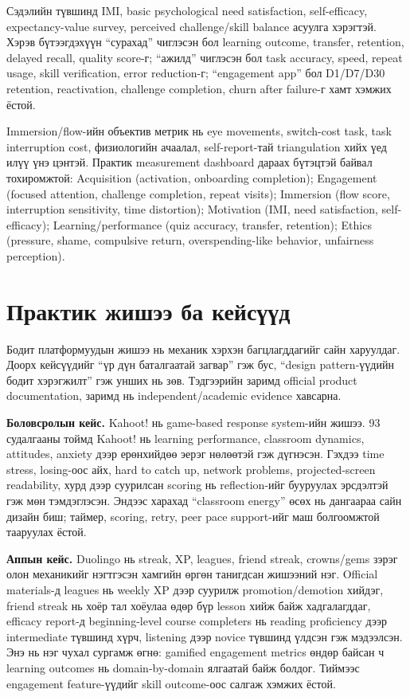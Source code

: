 \begin{sloppy}
Сэдэлийн түвшинд IMI, basic psychological need satisfaction, self-efficacy, expectancy-value survey, perceived challenge/skill balance асуулга хэрэгтэй. Хэрэв бүтээгдэхүүн ``сурахад'' чиглэсэн бол learning outcome, transfer, retention, delayed recall, quality score-г; ``ажилд'' чиглэсэн бол task accuracy, speed, repeat usage, skill verification, error reduction-г; ``engagement app'' бол D1/D7/D30 retention, reactivation, challenge completion, churn after failure-г хамт хэмжих ёстой.

Immersion/flow-ийн объектив метрик нь eye movements, switch-cost task, task interruption cost, физиологийн ачаалал, self-report-тай triangulation хийх үед илүү үнэ цэнтэй. Практик measurement dashboard дараах бүтэцтэй байвал тохиромжтой: Acquisition (activation, onboarding completion); Engagement (focused attention, challenge completion, repeat visits); Immersion (flow score, interruption sensitivity, time distortion); Motivation (IMI, need satisfaction, self-efficacy); Learning/performance (quiz accuracy, transfer, retention); Ethics (pressure, shame, compulsive return, overspending-like behavior, unfairness perception).

\section*{Практик жишээ ба кейсүүд}

Бодит платформуудын жишээ нь механик хэрхэн багцлагддагийг сайн харуулдаг. Доорх кейсүүдийг ``үр дүн баталгаатай загвар'' гэж бус, ``design pattern-үүдийн бодит хэрэгжилт'' гэж унших нь зөв. Тэдгээрийн заримд official product documentation, заримд нь independent/academic evidence хавсарна.

\textbf{Боловсролын кейс.} Kahoot! нь game-based response system-ийн жишээ. 93 судалгааны тоймд Kahoot! нь learning performance, classroom dynamics, attitudes, anxiety дээр ерөнхийдөө эерэг нөлөөтэй гэж дүгнэсэн. Гэхдээ time stress, losing-оос айх, hard to catch up, network problems, projected-screen readability, хурд дээр суурилсан scoring нь reflection-ийг бууруулах эрсдэлтэй гэж мөн тэмдэглэсэн. Эндээс харахад ``classroom energy'' өсөх нь дангаараа сайн дизайн биш; таймер, scoring, retry, peer pace support-ийг маш болгоомжтой тааруулах ёстой.

\textbf{Аппын кейс.} Duolingo нь streak, XP, leagues, friend streak, crowns/gems зэрэг олон механикийг нэгтгэсэн хамгийн өргөн танигдсан жишээний нэг. Official materials-д leagues нь weekly XP дээр суурилж promotion/demotion хийдэг, friend streak нь хоёр тал хоёулаа өдөр бүр lesson хийж байж хадгалагддаг, efficacy report-д beginning-level course completers нь reading proficiency дээр intermediate түвшинд хүрч, listening дээр novice түвшинд үлдсэн гэж мэдээлсэн. Энэ нь нэг чухал сургамж өгнө: gamified engagement metrics өндөр байсан ч learning outcomes нь domain-by-domain ялгаатай байж болдог. Тиймээс engagement feature-үүдийг skill outcome-оос салгаж хэмжих ёстой.


\end{sloppy}
